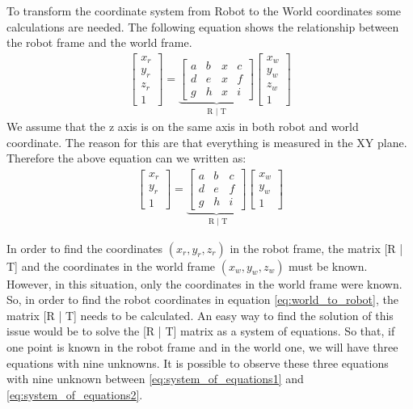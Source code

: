To transform the coordinate system from Robot to the World coordinates some calculations are needed. The following equation shows the relationship between the robot frame and the world frame.
\begin{align*}
\begin{bmatrix}
x_r \\
y_r \\
z_r \\
1 
\end{bmatrix}
= \underbrace{\begin{bmatrix}
a & b & x & c \\
d & e & x & f \\
g & h & x & i 
\end{bmatrix}}_{\text{R | T}}
\begin{bmatrix}
x_w \\
y_w \\
z_w\\
1 
\end{bmatrix}
\end{align*}
We assume that the z axis is on the same axis in both robot and world coordinate. The reason for this are that everything is measured in the XY plane. Therefore the above equation can we written as: 
\begin{align}
\begin{bmatrix}
x_r \\
y_r \\
1 
\end{bmatrix}
= \underbrace{\begin{bmatrix}
a & b & c \\
d & e & f \\
g & h & i 
\end{bmatrix}}_{\text{    R   | T}}
\begin{bmatrix}
x_w \\
y_w \\
1 
\end{bmatrix}
\label{eq:world_to_robot}
\end{align}

In order to find the coordinates $(x_r,y_r,z_r)$ in the robot frame, the matrix [R | T] and the coordinates in the world frame $(x_w,y_w,z_w)$ must be known. However, in this situation, only  the coordinates in the world frame were known. So, in order to find the robot coordinates in equation \ref{eq:world_to_robot}, the matrix [R | T] needs to be calculated. An easy way to find the solution of this issue would be to solve the [R | T] matrix as a system of equations. So that, if one point is known in the robot frame and in the world one, we will have three equations with nine unknowns. It is possible to observe these three equations with nine unknown between \ref{eq:system_of_equations1} and \ref{eq:system_of_equations2}.
 
